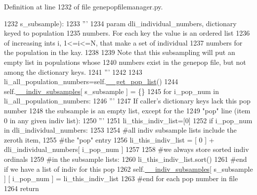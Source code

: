 Definition at line 1232 of file genepopfilemanager.\+py.


\begin{DoxyCode}
1232             s\_subsample):
1233         \textcolor{stringliteral}{'''}
1234 \textcolor{stringliteral}{        param dli\_individual\_numbers, dictionary keyed to population}
1235 \textcolor{stringliteral}{                numbers.  For each key the value is an ordered list}
1236 \textcolor{stringliteral}{                of increasing ints i, 1<=i<=N, that make a set of individual}
1237 \textcolor{stringliteral}{                numbers for the population in the kay.}
1238 \textcolor{stringliteral}{}
1239 \textcolor{stringliteral}{        Note that this subsampling will put an empty list in populations whose}
1240 \textcolor{stringliteral}{        numbers exist in the genepop file, but not among the dictionary keys.}
1241 \textcolor{stringliteral}{        '''}
1242 
1243         li\_all\_population\_numbers=self.\hyperlink{classnegui_1_1genepopfilemanager_1_1GenepopFileManager_a0cd3178624c652968b4d319f12e5df6e}{\_\_get\_pop\_list}()
1244         self.\hyperlink{classnegui_1_1genepopfilemanager_1_1GenepopFileManager_a1e8379bcee4902ca9314ff53fcb71644}{\_\_indiv\_subsamples}[ s\_subsample ] = \{\}
1245         \textcolor{keywordflow}{for} i\_pop\_num \textcolor{keywordflow}{in} li\_all\_population\_numbers:
1246             \textcolor{stringliteral}{'''}
1247 \textcolor{stringliteral}{            If caller's dictionary keys lack this pop number}
1248 \textcolor{stringliteral}{            the subsample is an empty list, except for the}
1249 \textcolor{stringliteral}{            "pop" line (item 0 in any given indiv list):}
1250 \textcolor{stringliteral}{            '''}
1251             li\_this\_indiv\_list=[0]
1252             \textcolor{keywordflow}{if} i\_pop\_num \textcolor{keywordflow}{in} dli\_individual\_numbers:
1253                 
1254                 \textcolor{comment}{#all indiv subsample lists include the zeroth item,}
1255                 \textcolor{comment}{#the "pop" entry}
1256                 li\_this\_indiv\_list =  [ 0 ] +  dli\_individual\_numbers[ i\_pop\_num ] 
1257 
1258                 \textcolor{comment}{#we always store sorted indiv ordinals}
1259                 \textcolor{comment}{#in the subsample lists:}
1260                 li\_this\_indiv\_list.sort()
1261             \textcolor{comment}{#end if we have a list of indiv for this pop}
1262             self.\hyperlink{classnegui_1_1genepopfilemanager_1_1GenepopFileManager_a1e8379bcee4902ca9314ff53fcb71644}{\_\_indiv\_subsamples}[ s\_subsample ] [ i\_pop\_num ] = li\_this\_indiv\_list
1263         \textcolor{comment}{#end for each pop number in file}
1264         \textcolor{keywordflow}{return}
\end{DoxyCode}
